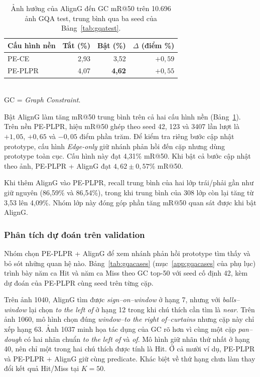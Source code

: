 \begin{table}[!ht]\centering\small
\caption{Ảnh hưởng của AlignG đến GC mR@50 trên 10.696 ảnh GQA test,
trung bình qua ba seed của Bảng~\ref{tab:gqatest}.}
\label{tab:gqa-aligng-test}
\begin{tabular}{@{}lrrr@{}}\toprule
Cấu hình nền & Tắt (\%) & Bật (\%) & $\Delta$ (điểm \%)\\\midrule
PE-CE   & 2,93 & 3,52 & $+0{,}59$\\
PE-PLPR & 4,07 & \textbf{4,62} & $+0{,}55$\\\bottomrule
\end{tabular}\\[2pt]
{\footnotesize GC = \textit{Graph Constraint}.}
\end{table}

Bật AlignG làm tăng mR@50 trung bình trên cả hai cấu hình nền
(Bảng~\ref{tab:gqa-aligng-test}). Trên nền PE-PLPR, hiệu mR@50 ghép theo
seed 42, 123 và 3407 lần lượt là $+1{,}05$, $+0{,}65$ và $-0{,}05$ điểm
phần trăm. Để kiểm tra riêng bước cập nhật prototype, cấu hình
\textit{Edge-only} giữ nhánh phản hồi đến cặp nhưng dùng prototype toàn
cục. Cấu hình này đạt 4,31\% mR@50. Khi bật cả bước cập nhật theo ảnh,
PE-PLPR + AlignG đạt $4{,}62 \pm 0{,}57$\% mR@50.

Khi thêm AlignG vào PE-PLPR, recall trung bình của hai lớp trái/phải gần
như giữ nguyên (86,59\% và 86,54\%), trong khi trung bình của 308 lớp còn
lại tăng từ 3,53 lên 4,09\%. Nhóm lớp này đóng góp phần tăng mR@50
quan sát được khi bật AlignG.

\subsubsection{Phân tích dự đoán trên validation}
Nhóm chọn PE-PLPR + AlignG để xem nhánh phản hồi prototype tìm
thấy và bỏ sót những quan hệ nào. Bảng~\ref{tab:gqacases} (mục~\ref{app:gqacases} của phụ lục) trình bày
năm ca Hit và năm ca Miss theo GC top-50 với seed cố định 42,
kèm dự đoán của PE-PLPR cùng seed trên từng cặp.

Trên ảnh 1040, AlignG tìm được \textit{sign--on--window} ở hạng 7,
nhưng với \textit{balls--window} lại chọn \textit{to the left of} ở hạng 12
trong khi chú thích cần tìm là \textit{near}. Trên ảnh 1060, mô hình
chọn đúng \textit{window--to the right of--curtains} nhưng cặp này chỉ
xếp hạng 63. Ảnh 1037 minh họa tác dụng của GC rõ hơn vì cùng một cặp
\textit{pan--dough} có hai nhãn chuẩn \textit{to the left of} và \textit{of}.
Mô hình giữ nhãn thứ nhất ở hạng 40, nên chỉ một trong hai chú thích được
tính là Hit. Ở cả mười ví dụ, PE-PLPR và PE-PLPR + AlignG giữ cùng predicate. Khác biệt về thứ hạng chưa làm thay đổi kết quả Hit/Miss tại $K=50$.

